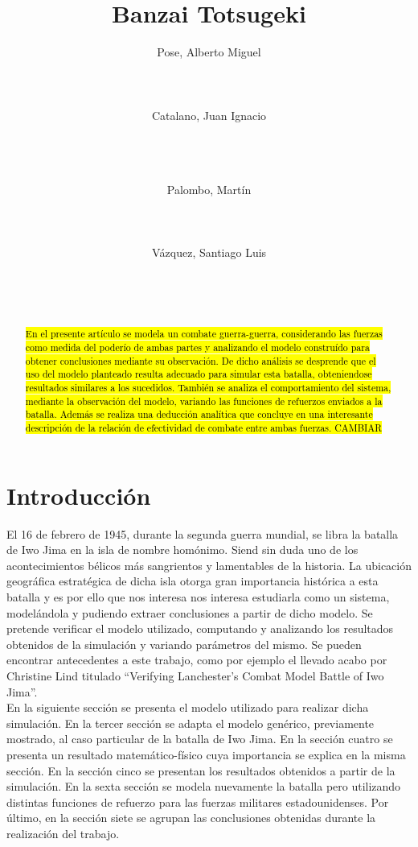 \documentclass{sig-alternate}
\title{Banzai Totsugeki}
\author{
\alignauthor
Pose, Alberto Miguel\\
       \affaddr{ITBA}\\
       \affaddr{Madero 399}\\
       \affaddr{Buenos Aires, Argentina}\\
       \email{apose@alu.itba.edu.ar}
\alignauthor
Catalano, Juan Ignacio\\
       \affaddr{ITBA}\\
       \affaddr{Madero 399}\\
       \affaddr{Buenos Aires, Argentina}\\
       \email{jcatalan@alu.itba.edu.ar}
\and
\alignauthor 
Palombo, Martín\\
       \affaddr{ITBA}\\
       \affaddr{Madero 399}\\
       \affaddr{Buenos Aires, Argentina}\\
       \email{mpalombo@alu.itba.edu.ar}
\alignauthor 
Vázquez, Santiago Luis\\
       \affaddr{ITBA}\\
       \affaddr{Madero 399}\\
       \affaddr{Buenos Aires, Argentina}\\
       \email{savazque@alu.itba.edu.ar}
}
\date{}
\begin{document}
\maketitle

\begin{abstract}
\hl{En el presente art\'iculo se modela un combate guerra-guerra, considerando las fuerzas como medida del poder\'io de ambas partes y 
analizando el modelo constru\'ido para obtener conclusiones mediante su observaci\'on. De dicho an\'alisis se desprende que el uso del modelo planteado
resulta adecuado para simular esta batalla, obteniendose resultados similares a los sucedidos. Tambi\'en se analiza el comportamiento del sistema,
mediante la observaci\'on del modelo, variando las funciones de refuerzos enviados a la batalla. Adem\'as se realiza una deducci\'on anal\'itica que
concluye en una interesante descripci\'on de la relaci\'on de efectividad de combate entre ambas fuerzas. CAMBIAR}
\end{abstract} 



\newpage

\section{Introducci\'on}

El 16 de febrero de 1945, durante la segunda guerra mundial, se libra la batalla de Iwo Jima en la isla de nombre homónimo. 
Siend sin duda uno de los acontecimientos bélicos más sangrientos y lamentables de la historia. La ubicación geográfica estratégica de dicha
isla otorga gran importancia histórica a esta batalla y es por ello que nos interesa nos interesa estudiarla como un sistema, modelándola y 
pudiendo extraer conclusiones a partir de dicho modelo. Se pretende verificar el modelo utilizado,
computando y analizando los resultados obtenidos de la simulación y variando parámetros del mismo. Se pueden encontrar antecedentes a este 
trabajo, como por ejemplo el llevado acabo por Christine Lind titulado ``Verifying Lanchester’s Combat Model Battle of Iwo Jima''. \\ 
En la siguiente secci\'on se presenta el modelo utilizado para realizar dicha simulaci\'on. En la tercer secci\'on se adapta el modelo genérico,
previamente mostrado, al caso particular de la batalla de Iwo Jima. En la sección cuatro se presenta un resultado matem\'atico-f\'isico cuya 
importancia se explica en la misma secci\'on. En la secci\'on cinco se presentan los resultados obtenidos a partir de la simulaci\'on. En la
sexta sección se modela nuevamente la batalla pero utilizando distintas funciones de refuerzo para las fuerzas militares estadounidenses.
Por \'ultimo, en la secci\'on siete se agrupan las conclusiones obtenidas durante la realizaci\'on del trabajo.
\end{document}
